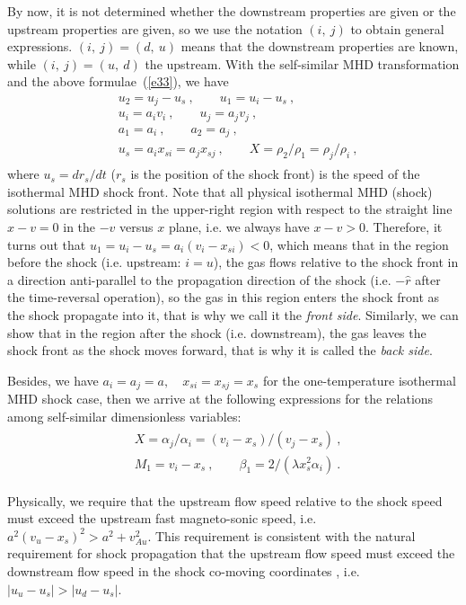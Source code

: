 \documentclass[fleqn,usenatbib]{mnras}
\begin{document}
By now, it is not determined whether the downstream properties are given or the upstream properties are given, so we use the notation $(i,\ j)$ to obtain general expressions. $(i,\ j)=(d,\ u)$ means that the downstream properties are known, while $(i,\ j)=(u,\ d)$ the upstream. With the self-similar MHD transformation and the above formulae~(\ref{e33}), we have
\begin{gather}
\begin{split}
&u_{2}=u_{j}-u_{s}\ , \qquad u_{1}=u_{i}-u_{s}\ ,\\
&u_{i}=a_{i}v_{i}\ , \qquad u_{j}=a_{j}v_{j}\ ,\\
&a_{1}=a_{i}\ , \qquad a_{2}=a_{j}\ ,\\
&u_{s}=a_{i}x_{si}=a_{j}x_{sj}\ , \qquad X=\rho_{2}/\rho_{1}=\rho_{j}/\rho_{i}\ ,
\end{split}\label{e35}
\end{gather}
where $u_{s}=dr_{s}/dt$ ($r_{s}$ is the position of the shock front) is the speed of the isothermal MHD shock front. Note that all physical isothermal MHD (shock) solutions are restricted in the upper-right region with respect to the straight line $x-v=0$ in the $-v$ versus $x$ plane, i.e. we always have $x-v>0$. Therefore, it turns out that $u_{1}=u_{i}-u_{s}=a_{i}\left(v_{i}-x_{si}\right)<0$, which means that in the region before the shock (i.e. upstream: $i=u$), the gas flows relative to the shock front in a direction anti-parallel to the propagation direction of the shock (i.e. $-\widehat{r}$ after the time-reversal operation), so the gas in this region enters the shock front as the shock propagate into it, that is why we call it the \textit{front side}. Similarly, we can show that in the region after the shock (i.e. downstream), the gas leaves the shock front as the shock moves forward, that is why it is called the \textit{back side}.

Besides, we have $a_{i}=a_{j}=a, \quad x_{si}=x_{sj}=x_{s}$ for the one-temperature isothermal MHD shock case, then we arrive at the following expressions for the relations among self-similar dimensionless variables:
\begin{gather}
\begin{split}
&X=\alpha_{j}/\alpha_{i}=(v_{i}-x_{s})/(v_{j}-x_{s})\ ,\\
&M_{1}=v_{i}-x_{s}\ , \qquad \beta_{1}
 =2/(\lambda x^{2}_{s}\alpha_{i})\ .
\end{split}\label{e36}
\end{gather}

Physically, we require that the upstream flow speed relative to the shock speed must exceed the upstream fast magneto-sonic speed, i.e. $a^{2}(v_{u}-x_{s})^{2}>a^{2}+v^{2}_{Au}$. This requirement is consistent with the natural requirement for shock propagation that the upstream flow speed must exceed the downstream flow speed in the shock co-moving coordinates \citep{FM}, i.e. $|u_{u}-u_{s}|>|u_{d}-u_{s}|$.
\end{document}
